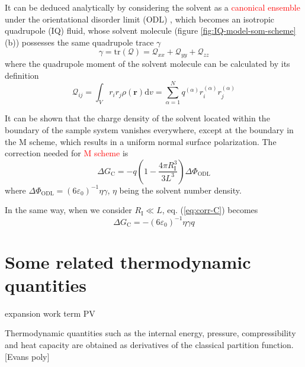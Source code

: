 It can be deduced analytically by considering the solvent as a \textcolor{red}{canonical
ensemble} under the orientational disorder limit (ODL) \citep{Kastenholz_2006_I},
which becomes an isotropic quadrupole (IQ) fluid, whose solvent molecule
(figure \ref{fig:IQ-model-som-scheme} (b)) possesses the same quadrupole
trace $\gamma$ 
\begin{equation}
\gamma=\mathrm{tr}(\mathbf{\mathcal{Q}})=\mathcal{Q}_{xx}+\mathcal{Q}_{yy}+\mathcal{Q}_{zz}
\end{equation}
where the quadrupole moment of the solvent molecule can be calculated
by its definition \citep{Multipole}
\begin{equation}
\mathcal{Q}_{ij}=\int_{V}r_{i}r_{j}\rho(\mathbf{r})\mathrm{d}v=\sum_{\alpha=1}^{N}q^{(\alpha)}r_{i}^{(\alpha)}r_{j}^{(\alpha)}
\end{equation}


It can be shown that the charge density of the solvent located within
the boundary of the sample system vanishes everywhere, except at the
boundary in the M scheme, which results in a uniform normal surface
polarization. The correction needed for\textcolor{red}{{} M scheme }is
\begin{equation}
\Delta G_{\mathrm{C}}=-q\left(1-\frac{4\pi R_{\mathrm{I}}^{3}}{3L^{3}}\right)\Delta\Phi_{\mathrm{ODL}}\label{eq:corr-C}
\end{equation}
where $\Delta\Phi_{\mathrm{ODL}}=\left(6\varepsilon_{0}\right)^{-1}\eta\gamma$,
$\eta$ being the solvent number density.

In the same way, when we consider $R_{\mathrm{I}}\ll L$, eq. (\ref{eq:corr-C})
becomes
\begin{equation}
\Delta G_{\mathrm{C}}=-\left(6\varepsilon_{0}\right)^{-1}\eta\gamma q
\end{equation}



\section{Some related thermodynamic quantities}

\textquotedbl{}expansion work\textquotedbl{} term PV

Thermodynamic quantities such as the internal energy, pressure, compressibility
and heat capacity are obtained as derivatives of the classical partition
function. {[}Evans poly{]}

